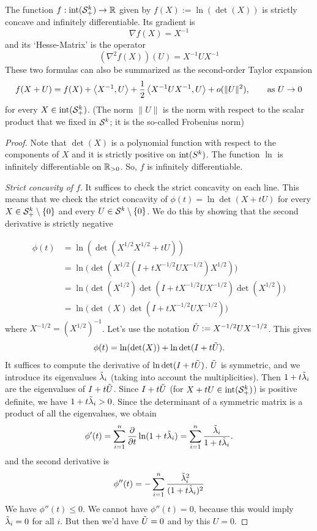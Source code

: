 \begin{proposition}
	The function $f : \operatorname{int}(\mathcal{S}_+^k) \to \mathbb{R}$ given by $f(X) := \ln (\det (X))$ is strictly concave and infinitely differentiable. Its gradient is 
	\[
		\nabla f(X) = X^{-1}
	\]
	and its `Hesse-Matrix' is the operator
	\[
		(\nabla^2 f(X)) (U) = X^{-1} U X^{-1}
	\]
	These two formulas can also be summarized as the second-order Taylor expansion 
	\[
		f(X+U) = f(X) + \left\langle X^{-1} , U \right\rangle + \frac{1}{2} \left\langle X^{-1} U X^{-1}  , U \right\rangle + o(\|U\|^2), \qquad \text{as} \ U \to 0
	\]
	for every $X \in \operatorname{int}(\mathcal{S}_+^k)$. (The norm $\|U\|$ is the norm with respect to the scalar product that we fixed in $\mathcal{S}^k$; it is the so-called Frobenius norm)
\end{proposition}
\begin{proof}
	Note that $\det(X)$ is a polynomial function with respect to the components of $X$ and it is strictly positive on $\operatorname{int}(S^k)$. The function $\ln$ is infinitely differentiable on $\mathbb{R}_{>0}$. So, $f$ is infinitely differentiable. 
	
	\emph{Strict concavity of $f$}. It suffices to check the strict concavity on each line. This means that we check the strict concavity of $\phi(t) = \ln \det(X+ t U)$ for every $X \in \mathcal{S}_+^k \setminus \{0\}$ and every $U \in \mathcal{S}^k \setminus \{0\}$. We do this by showing that the second derivative is strictly negative
	
	\begin{align*}
		\phi(t) & = \ln ( \det(X^{1/2} X^{1/2} + t U) )
		\\ & =  \ln \bigl(\det(X^{1/2} (I + t X^{-1/2} U X^{-1/2}) X^{1/2}) \bigr)
		\\ & = \ln \bigl( \det(X^{1/2}) \det(I + t X^{-1/2} U X^{-1/2}) \det(X^{1/2}) \bigr)
		\\ & = \ln \bigl( \det(X) \det(I+ t X^{-1/2} U X^{-1/2}) \bigr)
	\end{align*}
	where $X^{-1/2} = (X^{1/2})^{-1}$. Let's use the notation  $\Tilde{U}:=X^{-1/2} U X^{-1/2}$. This gives
	\begin{align*}
		\phi(t) = \ln(\det(X)) + \ln \det(I+ t \Tilde{U}).
	\end{align*}
	It suffices to compute the derivative of $\ln \det(I + t \Tilde{U})$. $\Tilde{U}$ is symmetric, and we introduce its eigenvalues $\Tilde{\lambda}_i$ (taking into account the multiplicities). Then $1 + t \Tilde{\lambda}_i$ are the eigenvalues of $I + t \Tilde{U}$. Since $I + t \Tilde{U}$ (for $X + t U \in \operatorname{int}(\mathcal{S}_+^k)$) is positive definite, we have $1 + t \Tilde{\lambda}_i > 0$. Since the determinant of a symmetric matrix is a product of all the eigenvalues, we obtain 
	\[
		\phi'(t) = \sum_{i=1}^n \frac{\partial {}}{\partial {t}} \ln(1+ t \Tilde{\lambda}_i) = \sum_{i=1}^n \frac{\Tilde{\lambda}_i}{1 + t \Tilde{\lambda}_i}.
	\]
	and the second derivative is 
	\[
		\phi''(t) = - \sum_{i=1}^n \frac{ \Tilde{\lambda}_i^2}{ (1 + t \Tilde{\lambda}_i)^2}
	\]
	We have $\phi''(t) \le 0$. We cannot have $\phi''(t) = 0$, because this would imply $\Tilde{\lambda}_i = 0$ for all $i$. But then we'd have $\Tilde{U} = 0$ and by this $U = 0$.
	

\end{proof}
